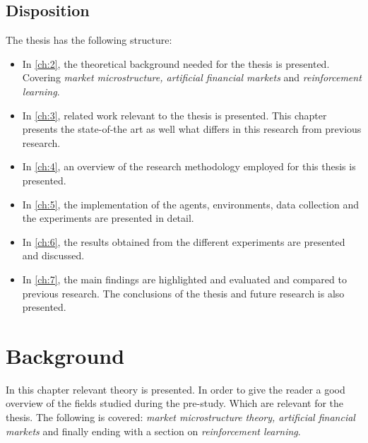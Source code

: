 \documentclass{kththesis}
\theoremstyle{definition}
\begin{document}
\newpage
\section{Disposition}
The thesis has the following structure:

\begin{itemize}
    \item In \autoref{ch:2}, the theoretical background needed for the thesis is presented. Covering \textit{market microstructure, artificial financial markets} and \textit{reinforcement learning}.
    
    \item In \autoref{ch:3}, related work relevant to the thesis is presented. This chapter presents the state-of-the art as well what differs in this research from previous research.
    
    \item In \autoref{ch:4}, an overview of the research methodology employed for this thesis is presented.
    
    \item In \autoref{ch:5}, the implementation of the agents, environments, data collection and the experiments are presented in detail.
    
    \item In \autoref{ch:6}, the results obtained from the different experiments are presented and discussed.
    
    \item In \autoref{ch:7}, the main findings are highlighted and evaluated and compared to previous research. The conclusions of the thesis and future research is also presented.
\end{itemize}

\chapter{Background}\label{ch:2}
In this chapter relevant theory is presented. In order to give the reader a good overview of the fields studied during the pre-study. Which are relevant for the thesis. The following is covered: \textit{market microstructure theory, artificial financial markets} and finally ending with a section on \textit{reinforcement learning}.

\end{document}
